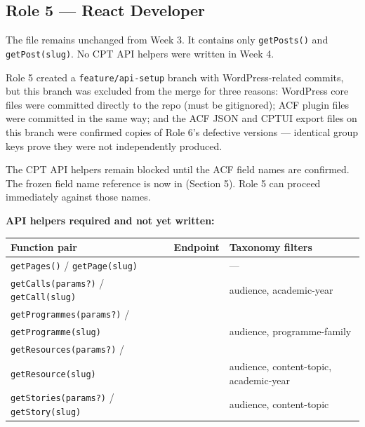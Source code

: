 \documentclass[12pt,a4paper]{article}
\begin{document}
\subsection{Role 5 --- React Developer}

The file  remains unchanged from Week 3.
It contains only \texttt{getPosts()} and \texttt{getPost(slug)}.
No CPT API helpers were written in Week 4.

\begin{bluebox}
Role 5 created a \texttt{feature/api-setup} branch with WordPress-related
commits, but this branch was excluded from the merge for three reasons:
WordPress core files were committed directly to the repo (must be gitignored);
ACF plugin files were committed in the same way; and the ACF JSON and CPTUI
export files on this branch were confirmed copies of Role 6's defective
versions --- identical group keys prove they were not independently produced.

\vspace{4pt}
The CPT API helpers remain blocked until the ACF field names are confirmed.
The frozen field name reference is now in
 (Section 5).
Role 5 can proceed immediately against those names.
\end{bluebox}

\vspace{0.8em}
\noindent\textbf{API helpers required and not yet written:}
\vspace{0.4em}

\begin{longtable}{@{}L{4.8cm}L{5.2cm}L{3.2cm}@{}}
\toprule
{}
\textbf{Function pair} & \textbf{Endpoint} & \textbf{Taxonomy filters} \\
\midrule
\endhead
\texttt{getPages()} / \texttt{getPage(slug)}
    & 
    & --- \\
\addlinespace
\texttt{getCalls(params?)} / \texttt{getCall(slug)}
    & 
    & audience, academic-year \\
\addlinespace
\texttt{getProgrammes(params?)} /\\
\texttt{getProgramme(slug)}
    & 
    & audience, programme-family \\
\addlinespace
\texttt{getResources(params?)} /\\
\texttt{getResource(slug)}
    & 
    & audience, content-topic, academic-year \\
\addlinespace
\texttt{getStories(params?)} / \texttt{getStory(slug)}
    & 
    & audience, content-topic \\
\bottomrule
\end{longtable}
\end{document}
